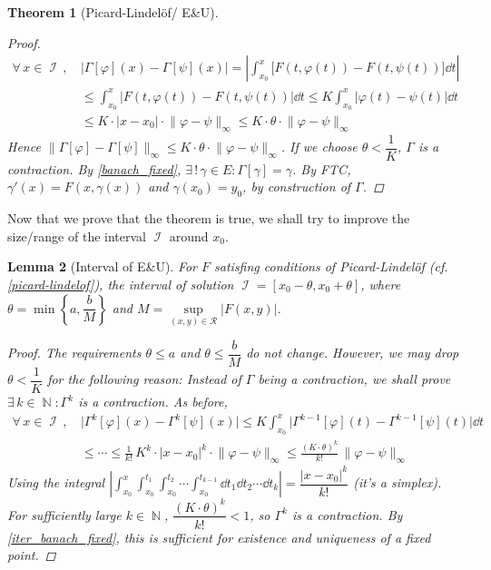 \documentclass[12pt]{article}
\newcommand{\Forall}[1]{\forall\,{#1}\,,\,}
\newcommand{\Exist}[1]{\exists\,{#1}:}
\DeclareMathOperator{\N}{\mathbb{N}}
\DeclareMathOperator{\I}{\mathcal{I}}
\newtheorem{theorem}{Theorem}[subsection]
\newtheorem{lemma}[theorem]{Lemma}
\begin{document}
\begin{theorem}[Picard-Lindelöf/ E\&U]
\begin{proof}
    \begin{align*}
      \Forall{x\in\I}&\big|\Gamma[\varphi](x)-\Gamma[\psi](x)\big|=\left|\int_{x_0}^x \Big[F(t,\varphi(t))-F(t,\psi(t))\Big]\dd{t}\right|\\
      &\leq \int_{x_0}^x \Big|F(t,\varphi(t))-F(t,\psi(t))\Big|\dd{t}\leq K\int_{x_0}^x \big|\varphi(t)-\psi(t)\big|\dd{t}\\ &\leq K\cdot|x-x_0|\cdot \big\|\varphi-\psi\big\|_\infty \leq K\cdot\theta\cdot \big\|\varphi-\psi\big\|_\infty
    \end{align*}
    Hence $\big\|\Gamma[\varphi]-\Gamma[\psi]\big\|_\infty\leq  K\cdot\theta\cdot \big\|\varphi-\psi\big\|_\infty$.
    If we choose $\theta<\dfrac{1}{K}$, $\Gamma$ is a contraction. By \ref{banach_fixed}, $\Exist{!\,\gamma\in E}\Gamma[\gamma]=\gamma$. By FTC, $\gamma'(x)=F(x,\gamma(x))$ and $\gamma(x_0)=y_0$, by construction of $\Gamma$.
  \end{proof}
\end{theorem}

\noindent Now that we prove that the theorem is true, we shall try to improve the size/range of the interval $\I$ around $x_0$.

\begin{lemma}[Interval of E\&U]
  \label{interval_of_uniqueness}
  For $F$ satisfing conditions of Picard-Lindelöf (cf. \ref{picard-lindelof}), the interval of solution $\I=[x_0-\theta,x_0+\theta]$, where $\theta=\min\left\{a,\dfrac{b}{M}\right\}$ and $M=\sup\limits_{(x,y)\in\mathcal{R}}|F(x,y)|$.
  \begin{proof}
    The requirements $\theta\leq a$ and $\theta\leq\dfrac{b}{M}$ do not change. However, we may drop $\theta<\dfrac{1}{K}$ for the following reason: Instead of $\Gamma$ being a contraction, we shall prove $\Exist{k\in\N}\Gamma^k$ is a contraction. As before,
    \begin{align*}
      \Forall{x\in\I}&\big|\Gamma^k[\varphi](x)-\Gamma^k[\psi](x)\big|\leq K\int_{x_0}^x \big|\Gamma^{k-1}[\varphi](t)-\Gamma^{k-1}[\psi](t)\big|\dd{t}\\ &\leq\cdots\leq \frac{1}{k!}\,K^k\cdot|x-x_0|^k\cdot \big\|\varphi-\psi\big\|_\infty \leq \frac{(K\cdot\theta)^k}{k!}\, \big\|\varphi-\psi\big\|_\infty
    \end{align*}
    Using the integral $\displaystyle \left|\int_{x_0}^x\int_{x_0}^{t_1}\int_{x_0}^{t_2}\cdots \int_{x_0}^{t_{k-1}}\dd{t_1}\dd{t_2}\cdots\dd{t_k}\right|=\dfrac{|x-x_0|^k}{k!}$ (it's a simplex). For sufficiently large $k\in\N$, $\dfrac{(K\cdot\theta)^k}{k!}<1$, so $\Gamma^k$ is a contraction. By \ref{iter_banach_fixed}, this is sufficient for existence and uniqueness of a fixed point.
  \end{proof}
\end{lemma}
\end{document}
